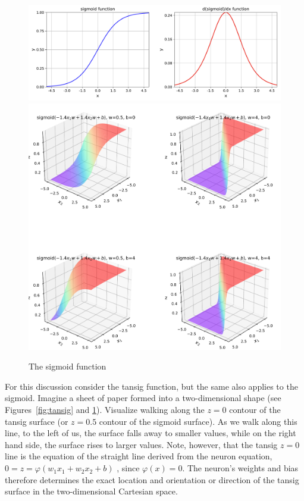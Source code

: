 \begin{figure}[p]
\centering
\includegraphics[width=\textwidth]{pic/sigmoid01}
\includegraphics[width=\textwidth]{pic/sigmoid02}
\caption{The sigmoid function \label{fig:sigmoid}}
\end{figure}

For this discussion consider the tansig function, but the same also applies to the sigmoid. 
Imagine a sheet of paper formed into a two-dimensional shape (see Figures~\ref{fig:tansig} and \ref{fig:sigmoid}).  Visualize walking along the $z=0$ contour of the tansig surface (or $z=0.5$ contour of the sigmoid surface).  As we walk along this line, to the left of us, the surface falls away to smaller values, while on the right hand side, the surface rises to larger values.  Note, however, that the tansig $z=0$ line is the equation of the straight line derived from the neuron equation, $0=z=\varphi(w_1x_1+w_2x_2+b)$ , since $\varphi(x)=0$.  The neuron's weights and bias therefore determines the exact location and orientation or direction of the tansig surface in the two-dimensional Cartesian space.  

